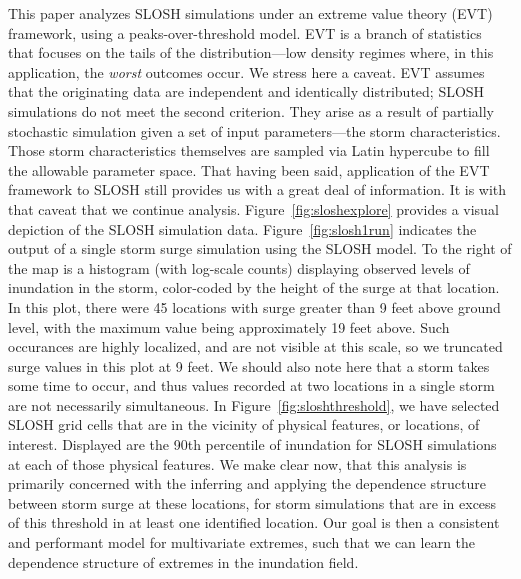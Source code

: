 This paper analyzes SLOSH simulations under an extreme value theory (EVT) framework, 
    using a peaks-over-threshold model.  EVT is a branch of statistics
    that focuses on the tails of the distribution---low density regimes where,
    in this application, the \emph{worst} outcomes occur.  
    We stress here a caveat. EVT assumes that the originating data are independent
    and identically distributed; SLOSH simulations do not meet the second criterion.
    They arise as a result of partially stochastic simulation given a set of input
    parameters---the storm characteristics.  Those storm characteristics themselves
    are sampled via Latin hypercube to fill the allowable parameter space.  That
    having been said, application of the EVT framework to SLOSH still provides us
    with a great deal of information.  It is with that caveat that we continue analysis.
    Figure~\ref{fig:sloshexplore} provides a visual depiction of the SLOSH 
    simulation data.  Figure~\ref{fig:slosh1run} indicates the output of a single 
    storm surge simulation using the SLOSH model. To the right of the map is a 
    histogram (with log-scale counts) displaying observed levels of inundation 
    in the storm, color-coded by the height of the surge at that location.  In this
    plot, there were 45 locations with surge greater than 9 feet above ground level,
    with the maximum value being approximately 19 feet above.  Such occurances
    are highly localized, and are not visible at this scale, so we truncated surge values
    in this plot at 9 feet.  We should also 
    note here that a storm takes some time to occur, and thus values recorded at 
    two locations in a single storm are not necessarily simultaneous.
    In Figure~\ref{fig:sloshthreshold}, we have selected SLOSH grid 
    cells that are in the vicinity of physical features, or locations, of 
    interest.  Displayed are the 90th percentile 
    of inundation for SLOSH simulations at each of those physical features.
    We make clear now, that this analysis is primarily concerned with the
    inferring and applying the dependence structure between storm surge at these locations,
    for storm simulations
    that are in excess of this threshold in at least one identified location.
    Our goal is then a consistent and performant model for multivariate extremes, 
    such that we can learn the dependence structure of extremes in the inundation field.


